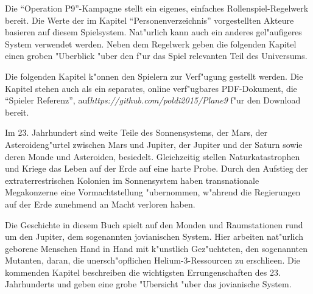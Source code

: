 
Die ``Operation P9''-Kampagne stellt ein eigenes, einfaches Rollenspiel-Regelwerk bereit. Die Werte der im Kapitel ``Personenverzeichnis'' vorgestellten Akteure basieren auf diesem Spielsystem. Nat"urlich kann auch ein anderes gel"aufigeres System verwendet werden. Neben dem Regelwerk geben die folgenden Kapitel einen groben "Uberblick "uber den f"ur das Spiel relevanten Teil des Universums.

\begin{remarks}
    Die folgenden Kapitel k"onnen den Spielern zur Verf"ugung gestellt werden. Die Kapitel stehen auch als ein separates, online verf"ugbares PDF-Dokument, die ``Spieler Referenz'', auf\newline{}\textit{https://github.com/poldi2015/Plane9} f"ur den Download bereit.
\end{remarks}


Im 23. Jahrhundert sind weite Teile des Sonnensystems, der Mars, der Asteroideng"urtel zwischen Mars und Jupiter, der Jupiter und der Saturn sowie deren Monde und Asteroiden, besiedelt. Gleichzeitig stellen Naturkatastrophen und Kriege das Leben auf der Erde auf eine harte Probe. Durch den Aufstieg der extraterrestrischen Kolonien im Sonnensystem haben transnationale Megakonzerne eine Vormachtstellung "ubernommen, w"ahrend die Regierungen auf der Erde zunehmend an Macht verloren haben.

Die Geschichte in diesem Buch spielt auf den Monden und Raumstationen rund um den Jupiter, dem sogenannten jovianischen System. Hier arbeiten nat"urlich geborene Menschen Hand in Hand mit k"unstlich Gez"uchteten, den sogenannten Mutanten, daran, die unersch"opflichen Helium-3-Ressourcen zu erschlie\3en. Die kommenden Kapitel beschreiben die wichtigsten Errungenschaften des 23. Jahrhunderts und geben eine grobe "Ubersicht "uber das jovianische System.




